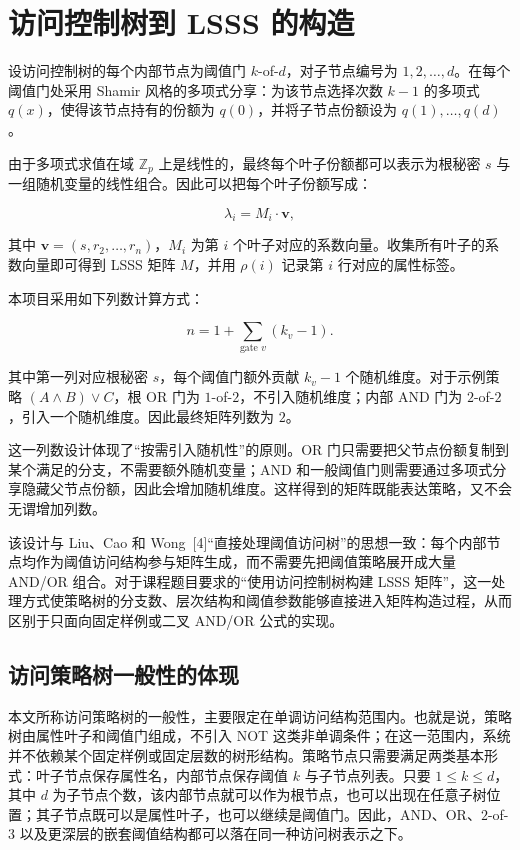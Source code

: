 \section{访问控制树到 LSSS 的构造}

设访问控制树的每个内部节点为阈值门 $k$-of-$d$，对子节点编号为 $1,2,\dots,d$。在每个阈值门处采用 Shamir 风格的多项式分享：为该节点选择次数 $k-1$ 的多项式 $q(x)$，使得该节点持有的份额为 $q(0)$，并将子节点份额设为 $q(1),\dots,q(d)$。

由于多项式求值在域 $\mathbb{Z}_p$ 上是线性的，最终每个叶子份额都可以表示为根秘密 $s$ 与一组随机变量的线性组合。因此可以把每个叶子份额写成：

\[
    \lambda_i = M_i \cdot \mathbf{v},
\]

其中 $\mathbf{v}=(s,r_2,\dots,r_n)$，$M_i$ 为第 $i$ 个叶子对应的系数向量。收集所有叶子的系数向量即可得到 LSSS 矩阵 $M$，并用 $\rho(i)$ 记录第 $i$ 行对应的属性标签。

本项目采用如下列数计算方式：

\[
    n = 1+\sum_{\text{gate }v}(k_v-1).
\]

其中第一列对应根秘密 $s$，每个阈值门额外贡献 $k_v-1$ 个随机维度。对于示例策略 $(A\wedge B)\vee C$，根 OR 门为 $1$-of-$2$，不引入随机维度；内部 AND 门为 $2$-of-$2$，引入一个随机维度。因此最终矩阵列数为 $2$。

这一列数设计体现了“按需引入随机性”的原则。OR 门只需要把父节点份额复制到某个满足的分支，不需要额外随机变量；AND 和一般阈值门则需要通过多项式分享隐藏父节点份额，因此会增加随机维度。这样得到的矩阵既能表达策略，又不会无谓增加列数。

该设计与 Liu、Cao 和 Wong~[4]“直接处理阈值访问树”的思想一致：每个内部节点均作为阈值访问结构参与矩阵生成，而不需要先把阈值策略展开成大量 AND/OR 组合。对于课程题目要求的“使用访问控制树构建 LSSS 矩阵”，这一处理方式使策略树的分支数、层次结构和阈值参数能够直接进入矩阵构造过程，从而区别于只面向固定样例或二叉 AND/OR 公式的实现。

\subsection{访问策略树一般性的体现}

本文所称访问策略树的一般性，主要限定在单调访问结构范围内。也就是说，策略树由属性叶子和阈值门组成，不引入 NOT 这类非单调条件；在这一范围内，系统并不依赖某个固定样例或固定层数的树形结构。策略节点只需要满足两类基本形式：叶子节点保存属性名，内部节点保存阈值 $k$ 与子节点列表。只要 $1\leq k\leq d$，其中 $d$ 为子节点个数，该内部节点就可以作为根节点，也可以出现在任意子树位置；其子节点既可以是属性叶子，也可以继续是阈值门。因此，AND、OR、$2$-of-$3$ 以及更深层的嵌套阈值结构都可以落在同一种访问树表示之下。

